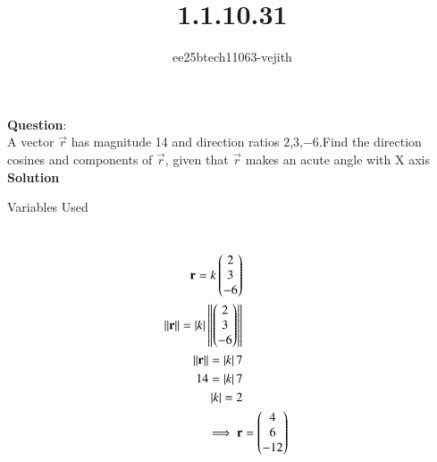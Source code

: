 \documentclass[journal]{IEEEtran}
\begin{document}

\vspace{3cm}

\title{1.1.10.31}
\author{ee25btech11063-vejith}

\maketitle
{\let\newpage\relax\maketitle}
\renewcommand{\thefigure}{\theenumi}
\renewcommand{\thetable}{\theenumi}
\setlength{\intextsep}{10pt} %
\textbf{Question}:\\
A vector $\vec{r}$ has magnitude 14 and direction ratios $2$,$3$,$-6$.Find the direction cosines and components of $\vec{r}$, given that $\vec{r}$ makes an acute angle with X axis\\ 
\textbf{Solution}\\
\begin{table}[h!]    
  \centering
  
  \caption{Variables Used}
  \label{}
\end{table}\\
\begin{align}
     \mathbf{r}=k\begin{pmatrix}2\\3\\-6\end{pmatrix}\\
     \left\lVert\mathbf{r}\right\rVert=\left\vert k\right\vert\left\lVert\begin{pmatrix}2\\3\\-6\end{pmatrix}\right\rVert\\
     \left\lVert\mathbf{r}\right\rVert=\left\vert k\right\vert7\\
     14=\left\vert k\right\vert7\\
     \left\vert k\right\vert=2\\
     \implies \mathbf{r}&=\begin{pmatrix}4\\6\\-12\end{pmatrix} 
\end{align}
\hspace*{5cm}\\
\end{document}
